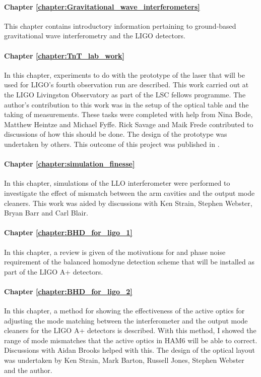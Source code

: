 \paragraph{Chapter \ref{chapter:Gravitational_wave_interferometers}}
This chapter contains introductory information pertaining to ground-based gravitational wave interferometry and the LIGO detectors.
\paragraph{Chapter \ref{chapter:TnT_lab_work}} 
In this chapter, experiments to do with the prototype of the laser that will be used for LIGO's fourth observation run are described. This work carried out at the LIGO Livingston Observatory as part of the LSC fellows programme. The author's contribution to this work was in the setup of the optical table and the taking of measurements. These tasks were completed with help from Nina Bode, Matthew Heintze and  Michael Fyffe. Rick Savage and Maik Frede contributed to discussions of how this should be done. The design of the prototype was undertaken by others. This outcome of this project was published in \cite{Bode2020a}.
\paragraph{Chapter \ref{chapter:simulation_finesse}}
In this chapter, simulations of the LLO interferometer were performed to investigate the effect of mismatch between the arm cavities and the output mode cleaners. This work was aided by discussions with Ken Strain, Stephen Webster, Bryan Barr and Carl Blair. 
\paragraph{Chapter \ref{chapter:BHD_for_ligo_1}} 
In this chapter, a review is given of the motivations for and phase noise requirement of the balanced homodyne detection scheme that will be installed as part of the LIGO A+ detectors.
\paragraph{Chapter \ref{chapter:BHD_for_ligo_2}} 
In this chapter, a method for showing the effectiveness of the active optics for adjusting the mode matching between the interferometer and the output mode cleaners for the LIGO A+ detectors is described. With this method, I showed the range of mode mismatches that the active optics in HAM6 will be able to correct. Discussions with Aidan Brooks helped with this. The design of the optical layout was undertaken by Ken Strain, Mark Barton, Russell Jones, Stephen Webster and the author.
